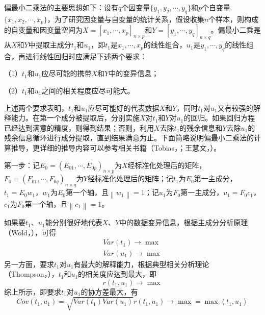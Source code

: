 偏最小二乘法的主要思想如下：设有$q$个因变量$\{{{y}_{1}},{{y}_{2}},\cdots ,{{y}_{q}}\}$和$p$个自变量$\{{{x}_{1}},{{x}_{2}},\cdots ,{{x}_{p}}\}$，为了研究因变量与自变量的统计关系，假设收集$n$个样本，则构成的自变量和因变量空间为$X={{[{{x}_{1}},\cdots ,{{x}_{p}}]}_{n\times p}}$和$Y={{[{{y}_{1}},\cdots ,{{y}_{q}}]}_{n\times q}}$。偏最小二乘是从$X$和$Y$中提取主成分$t_1$和$u_1$，即$t_1$是${{x}_{1}},\cdots ,{{x}_{p}}$的线性组合，$u_1$是${{y}_{1}},\cdots ,{{y}_{q}}$的线性组合，再进行线性回归时应满足下述两个要求：

（1）$t_1$和$u_1$应尽可能的携带$X$和$Y$中的变异信息；

（2）$t_1$和$u_1$之间的相关程度应尽可能大。

上述两个要求表明，$t_1$和$u_1$应尽可能好的代表数据$X$和$Y$，同时$t_1$对$u_1$又有较强的解释能力。在第一个成分被提取后，分别实施$X$对$t_1$和$Y$对$u_1$的回归。如果回归方程已经达到满意的精度，则得到结果；否则，利用$X$去除$t_1$的残余信息和$Y$去除$u_1$的残余信息循环进行成分提取，直到结果满意为止。下面简略说明偏最小二乘法的计算推导，更详细的推导内容可以参考相关书籍（Tobias，\citeyear{tobias1995introduction}；王慧文，\citeyear{王惠文1999偏最小二乘回归方法及其应用}）。

第一步：记${{E}_{0}}={{({{E}_{01}},\cdots ,{{E}_{0p}})}_{n\times p}}$为$X$经标准化处理后的矩阵，${{F}_{0}}={{({{F}_{01}},\cdots ,{{F}_{0q}})}_{n\times q}}$为$Y$经标准化处理后的矩阵；记$t_1$为${{E}_{0}}$第一主成分，$t_1={E_0}{w_1}$，$w_1$为$E_0$第一个轴，且$\left\| {{w}_{1}} \right\|=1$；记$u_1$为${{F}_{0}}$第一主成分，$u_1={F_0}{c_1}$，$c_1$为$F_0$第一个轴，且$\left\| {{c}_{1}} \right\|=1$。

如果要$t_1$、$u_1$能分别很好地代表$X$、$Y$中的数据变异信息，根据主成分分析原理（Wold，\citeyear{wold1987principal}），可得
\begin{align}
    \label{equ:variance1}
    Var({{t}_{1}})\to \max \\
    \label{equ:variance2}
    Var({{u}_{1}})\to \max
\end{align}
另一方面，要求$t_1$对$u_1$有最大的解释能力，根据典型相关分析理论（Thompson，\citeyear{thompson2005canonical}），$t_1$和$u_1$的相关度应达到最大，即
\begin{equation}
    \label{equ:relation}
    r({{t}_{1}},{{u}_{1}})\to \max 
\end{equation}
综上所示，即要求$t_1$对$u_1$的协方差最大，有
\begin{equation}
    \label{equ:relation}
    Cov({{t}_{1}},{{u}_{1}})=\sqrt{Var({{t}_{1}})Var({{u}_{1}})}r({{t}_{1}},{{u}_{1}})\to \max =\max \left\langle {{t}_{1}},{{u}_{1}} \right\rangle
\end{equation}

